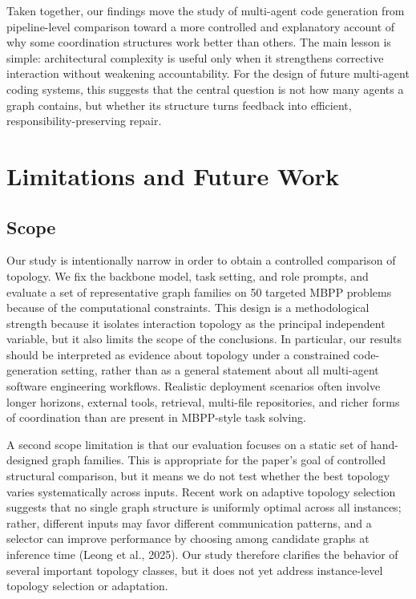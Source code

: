 \documentclass[manuscript,screen,review]{acmart}
\begin{document}
Taken together, our findings move the study of multi-agent code generation from pipeline-level comparison toward a more controlled and explanatory account of why some coordination structures work better than others. The main lesson is simple: architectural complexity is useful only when it strengthens corrective interaction without weakening accountability. For the design of future multi-agent coding systems, this suggests that the central question is not how many agents a graph contains, but whether its structure turns feedback into efficient, responsibility-preserving repair.

\section{Limitations and Future Work}
\subsection{Scope}

Our study is intentionally narrow in order to obtain a controlled comparison of topology. We fix the backbone model, task setting, and role prompts, and evaluate a set of representative graph families on 50 targeted MBPP problems because of the computational constraints. This design is a methodological strength because it isolates interaction topology as the principal independent variable, but it also limits the scope of the conclusions. In particular, our results should be interpreted as evidence about topology under a constrained code-generation setting, rather than as a general statement about all multi-agent software engineering workflows. Realistic deployment scenarios often involve longer horizons, external tools, retrieval, multi-file repositories, and richer forms of coordination than are present in MBPP-style task solving.

A second scope limitation is that our evaluation focuses on a static set of hand-designed graph families. This is appropriate for the paper’s goal of controlled structural comparison, but it means we do not test whether the best topology varies systematically across inputs. Recent work on adaptive topology selection suggests that no single graph structure is uniformly optimal across all instances; rather, different inputs may favor different communication patterns, and a selector can improve performance by choosing among candidate graphs at inference time (Leong et al., 2025). Our study therefore clarifies the behavior of several important topology classes, but it does not yet address instance-level topology selection or adaptation.
\end{document}

